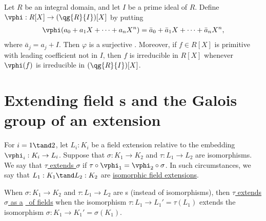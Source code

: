 \documentclass{article}
\begin{document}
  \begin{ttheorem}
    Let \( R \) be an integral domain, and let \( I \) be a prime ideal of \( R \).
    Define \( \vphi:R[X]\to (\qg{R}{I})[X] \) by putting \begin{align*}
      \vphi(a_0+a_1X+\cdots+a_nX^n) =\bar a_0+\bar a_1X+\cdots+\bar a_nX^n,
    \end{align*}
    where \( \bar a_j = a_j + I \).
    Then \( \varphi \) is a surjective \homo.
    Moreover, if \( f\in R[X] \) is primitive with leading coefficient not in \( I \), then \( f \) is irreducible in \( R[X] \) whenever \( \vphi(f) \) is irreducible in \( (\qg{R}{I})[X] \).
  \end{ttheorem}


\setcounter{tdefinition}{15}
\setcounter{section}{2}
\section{Extending field \homo s and the Galois group of an extension}
  \begin{tdefinition}
    For \( i = 1 \tand 2 \), let \( L_i : K_i \) be a field extension relative to the embedding \( \vphi_i : K_i\to L_i \).
    Suppose that \( \sigma : K_1\to K_2 \) and \( \tau:L_1\to L_2 \) are isomorphisms.
    We say that \ul{\( \tau \) extends \( \sigma \)} if \( \tau\circ\vphi_1 = \vphi_2\circ\sigma \).
    In such circumstances, we say that \( L_1 : K_1 \tand L_2 : K_2 \) are \ul{isomorphic field extensions}.

    When \( \sigma:K_1\to K_2 \) and \( \tau:L_1\to L_2 \) are \homo s (instead of isomorphisms), then \ul{\( \tau \) extends \( \sigma \) as a} \ul{\homo~of fields} when the isomorphism \( \tau:L_1\to L_1' = \tau(L_1) \) extends the isomorphism \( \sigma:K_1\to K_1' = \sigma(K_1) \).
  \end{tdefinition}
\end{document}
